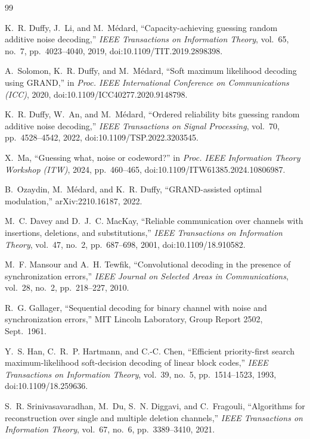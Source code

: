\documentclass[11pt]{article}
\theoremstyle{definition}
\theoremstyle{remark}
\begin{document}
\begin{thebibliography}{99}
\footnotesize

K.~R. Duffy, J.~Li, and M.~M\'edard,
``Capacity-achieving guessing random additive noise decoding,''
\emph{IEEE Transactions on Information Theory}, vol.~65, no.~7, pp.~4023--4040, 2019, doi:10.1109/TIT.2019.2898398.

A.~Solomon, K.~R. Duffy, and M.~M\'edard,
``Soft maximum likelihood decoding using GRAND,''
in \emph{Proc. IEEE International Conference on Communications (ICC)}, 2020, doi:10.1109/ICC40277.2020.9148798.

K.~R. Duffy, W.~An, and M.~M\'edard,
``Ordered reliability bits guessing random additive noise decoding,''
\emph{IEEE Transactions on Signal Processing}, vol.~70, pp.~4528--4542, 2022, doi:10.1109/TSP.2022.3203545.

X.~Ma,
``Guessing what, noise or codeword?''
in \emph{Proc. IEEE Information Theory Workshop (ITW)}, 2024, pp.~460--465, doi:10.1109/ITW61385.2024.10806987.

B.~Ozaydin, M.~M\'edard, and K.~R. Duffy,
``GRAND-assisted optimal modulation,''
arXiv:2210.16187, 2022.

M.~C. Davey and D.~J.~C. MacKay,
``Reliable communication over channels with insertions, deletions, and substitutions,''
\emph{IEEE Transactions on Information Theory}, vol.~47, no.~2, pp.~687--698, 2001, doi:10.1109/18.910582.

M.~F. Mansour and A.~H. Tewfik,
``Convolutional decoding in the presence of synchronization errors,''
\emph{IEEE Journal on Selected Areas in Communications}, vol.~28, no.~2, pp.~218--227, 2010.

R.~G. Gallager,
``Sequential decoding for binary channel with noise and synchronization errors,''
MIT Lincoln Laboratory, Group Report 2502, Sept.~1961.

Y.~S. Han, C.~R.~P. Hartmann, and C.-C. Chen,
``Efficient priority-first search maximum-likelihood soft-decision decoding of linear block codes,''
\emph{IEEE Transactions on Information Theory}, vol.~39, no.~5, pp.~1514--1523, 1993, doi:10.1109/18.259636.

S.~R. Srinivasavaradhan, M.~Du, S.~N. Diggavi, and C.~Fragouli,
``Algorithms for reconstruction over single and multiple deletion channels,''
\emph{IEEE Transactions on Information Theory}, vol.~67, no.~6, pp.~3389--3410, 2021.


\end{thebibliography}
\end{document}
